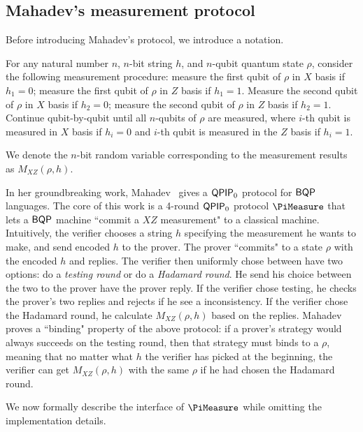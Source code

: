\subsection{Mahadev's measurement protocol}\label{sec:urmila4}

Before introducing Mahadev's protocol, we introduce a notation.

\begin{definition}[$M_{XZ}(\rho,h)$]

For any natural number $n$, $n$-bit string $h$, and $n$-qubit quantum state $\rho$, consider the following measurement procedure: measure the first qubit of $\rho$ in $X$ basis if $h_1=0$; measure the first qubit of $\rho$ in $Z$ basis if $h_1=1$.  Measure the second qubit of $\rho$ in $X$ basis if $h_2=0$; measure the second qubit of $\rho$ in $Z$ basis if $h_2=1$. Continue qubit-by-qubit until all $n$-qubits of $\rho$ are measured, where $i$-th qubit is measured in $X$ basis if $h_i=0$ and  $i$-th qubit is measured in the $Z$ basis if $h_i=1$. 

We denote the $n$-bit random variable corresponding to the measurement results as $M_{XZ}(\rho,h)$.

\end{definition}

In her groundbreaking work, Mahadev~\cite{FOCS:Mahadev18a} gives a $\operatorname{\mathsf{QPIP}}_0$ protocol for $\operatorname{\mathsf{BQP}}$ languages.
The core of this work is a 4-round $\operatorname{\mathsf{QPIP}}_0$ protocol $\PiMeasure$ that lets a $\operatorname{\mathsf{BQP}}$ machine ``commit a $XZ$ measurement" to a classical machine.
Intuitively, the verifier chooses a string $h$ specifying  the measurement he wants to make, and send encoded $h$ to the prover. The prover ``commits" to a state $\rho$ with the encoded $h$ and replies. The verifier then uniformly chose between have two options: do a \emph{testing round} or do a \emph{Hadamard round}. He send his choice between the two to the prover have the  prover reply. If the verifier chose testing, he checks the prover's two replies and rejects if he see a inconsistency. If the verifier chose the Hadamard round, he calculate $M_{XZ}(\rho,h)$ based on the replies. Mahadev~\cite{FOCS:Mahadev18a} proves a ``binding" property of the above protocol: if a prover's strategy would always succeeds on the testing round, then that strategy must binds to a $\rho$, meaning that no matter what $h$ the verifier has picked at the beginning, the verifier can get $M_{XZ}(\rho,h)$  with the same $\rho$ if he had chosen the Hadamard round.

We now formally describe the interface of $\PiMeasure$ while omitting the implementation details.


